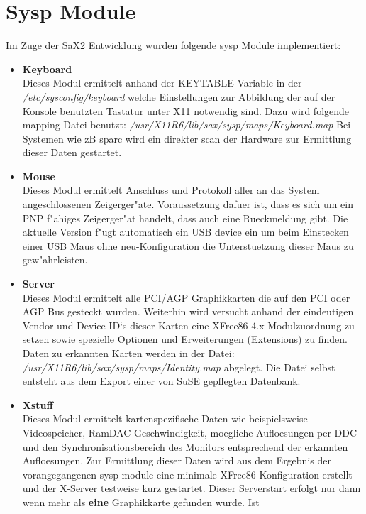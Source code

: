 \section{Sysp Module}
Im Zuge der SaX2 Entwicklung wurden folgende sysp Module implementiert:
\begin{itemize}
\item \textbf{Keyboard}\\
      Dieses Modul ermittelt anhand der KEYTABLE Variable in der
      \textit{/etc/sysconfig/keyboard} welche Einstellungen zur Abbildung der
      auf der Konsole benutzten Tastatur unter X11 notwendig sind. Dazu 
      wird folgende mapping Datei benutzt: 
      \textit{/usr/X11R6/lib/sax/sysp/maps/Keyboard.map}
      Bei Systemen wie zB sparc wird ein direkter scan der
      Hardware zur Ermittlung dieser Daten gestartet.
\item \textbf{Mouse}\\
      Dieses Modul ermittelt Anschluss und Protokoll aller an das System 
      angeschlossenen Zeigerger"ate. Voraussetzung dafuer ist, dass 
      es sich um ein PNP f"ahiges Zeigerger"at handelt, dass auch eine 
      Rueckmeldung gibt. Die aktuelle Version f"ugt automatisch ein
      USB device ein um beim Einstecken einer USB Maus ohne neu-Konfiguration
      die Unterstuetzung dieser Maus zu gew"ahrleisten.
\item \textbf{Server}\\
      Dieses Modul ermittelt alle PCI/AGP Graphikkarten die auf den 
      PCI oder AGP Bus gesteckt wurden. Weiterhin wird versucht anhand
      der eindeutigen Vendor und Device ID`s dieser Karten eine 
      XFree86 4.x Modulzuordnung zu setzen sowie spezielle Optionen 
      und Erweiterungen (Extensions) zu finden. Daten zu erkannten
      Karten werden in der Datei: 
      \textit{/usr/X11R6/lib/sax/sysp/maps/Identity.map} abgelegt.
      Die Datei selbst entsteht aus dem Export einer von SuSE gepflegten
      Datenbank.
\item \textbf{Xstuff}\\
      Dieses Modul ermittelt kartenspezifische Daten wie beispielsweise
      Videospeicher, RamDAC Geschwindigkeit, moegliche Aufloesungen per DDC
      und den Synchronisationsbereich des Monitors entsprechend der erkannten 
      Aufloesungen. Zur Ermittlung dieser Daten wird aus dem Ergebnis der 
      vorangegangenen sysp module eine minimale XFree86 Konfiguration erstellt
      und der X-Server testweise kurz gestartet. Dieser Serverstart erfolgt nur
      dann wenn mehr als \textbf{eine} Graphikkarte gefunden wurde. Ist

\end{itemize}

